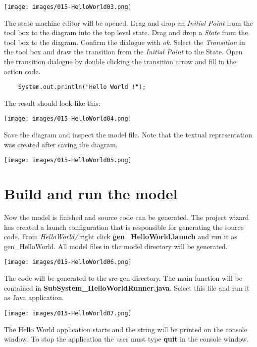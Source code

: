 \texttt{[image: images/015-HelloWorld03.png]}

The state machine editor will be opened. Drag and drop an \textit{Initial Point} from the tool box to the diagram into the top level state. Drag and drop a \textit{State} from the tool box to the diagram. Confirm the dialogue with \textit{ok}. Select the \textit{Transition} in the tool box and draw the transition from the \textit{Initial Point} to the State. Open the transition dialogue by double clicking the transition arrow and fill in the action code.

\begin{verbatim}
	System.out.println("Hello World !");
\end{verbatim}
 
The result should look like this:

\texttt{[image: images/015-HelloWorld04.png]}

Save the diagram and inspect the model file. Note that the textual representation was created after saving the diagram.

\texttt{[image: images/015-HelloWorld05.png]}


\section{Build and run the model}

Now the model is finished and source code can be generated. The project wizard has created a launch configuration that is responsible for generating the source code. From \textit{HelloWorld/} right click \textbf{gen\_HelloWorld.launch} and run it as gen\_HelloWorld. All model files in the model directory will be generated.

\texttt{[image: images/015-HelloWorld06.png]}

The code will be generated to the src-gen directory. The main function will be contained in \textbf{SubSystem\_HelloWorldRunner.java}. Select this file and run it as Java application.

\texttt{[image: images/015-HelloWorld07.png]}


The Hello World application starts and the string will be printed on the console window. To stop the application the user must type \textbf{quit} in the console window.

